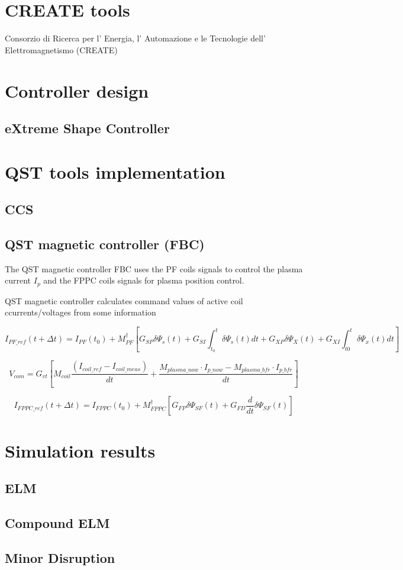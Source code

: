 \section{CREATE tools}
Consorzio di Ricerca per l' Energia, l' Automazione e le Tecnologie dell' Elettromagnetismo (CREATE)

\section{Controller design}
\subsection{eXtreme Shape Controller}
\section{QST tools implementation}
\subsection{CCS}
\subsection{QST magnetic controller (FBC)}


The QST magnetic controller FBC uses the PF coils signals to control the plasma current $I_p$ and the FPPC coils signals for plasma position control.

QST magnetic controller calculates command values of active coil ccurrents/voltages from some information

\begin{equation}
I_{PF\_ref}(t+\Delta t) = I_{PF}(t_0)+M^\dagger_{PF}\left[G_{SP}\delta\Psi_s(t)+G_{SI}\int_{t_0}^{t}\delta\Psi_s(t)dt+G_{XP}\delta\Psi_X(t)+G_{XI}\int_{t0}^{t}\delta\Psi_x(t)dt\right]
\end{equation}

\begin{equation}
V_{com}=G_{vt}\left[M_{coil}\frac{(I_{coil\_ref}-I_{coil\_meas})}{dt}+ \frac{M_{plasma\_now} \cdot I_{p\_now} - M_{plasma\_ bfr} \cdot I_{p\_bfr}}{dt}\right]
\end{equation}

\begin{equation}
I_{FPPC\_ref}(t+\Delta t)=I_{FPPC}(t_0)+ M^\dagger_{FPPC}\left[G_{FP}\delta \Psi_{SF}(t) + G_{FD}\frac{d}{dt}\delta\Psi_{SF}(t) \right]
\end{equation}
\section{Simulation results}	

\subsection{ELM}
\subsection{Compound ELM}
\subsection{Minor Disruption}